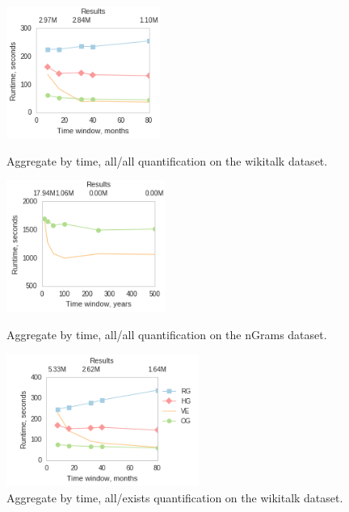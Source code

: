 \begin{figure}[h]
\begin{minipage}{2in}
\centering
\includegraphics[height=1.7in]{figs/agg_allall_wikitalk_vertices_build11_trimmed.png}
\caption{Aggregate by time, all/all quantification on the wikitalk dataset.}
\label{fig:agg1}
\end{minipage}
\begin{minipage}{2in}
\centering
\includegraphics[height=1.7in]{figs/agg_allall_ngrams_edges_build11_trimmed.png}
\caption{Aggregate by time, all/all quantification on the nGrams dataset.}
\label{fig:agg2}
\end{minipage}
\begin{minipage}{2.6in}
\centering
\includegraphics[height=1.7in]{figs/agg_allexists_wikitalk_edges_build11.png}
\caption{Aggregate by time, all/exists quantification on the wikitalk dataset.}
\label{fig:agg4}
\end{minipage}
\end{figure}

